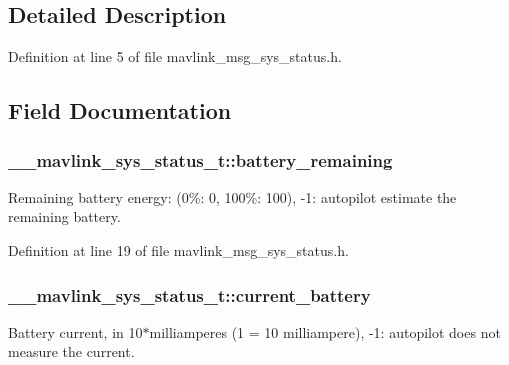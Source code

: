 \subsection{Detailed Description}


Definition at line 5 of file mavlink\-\_\-msg\-\_\-sys\-\_\-status.\-h.



\subsection{Field Documentation}
\hypertarget{struct____mavlink__sys__status__t_a89ff7e5cb3d8a698ace5c6653479b71e}{
\subsubsection[{battery\-\_\-remaining}]{ \-\_\-\-\_\-mavlink\-\_\-sys\-\_\-status\-\_\-t\-::battery\-\_\-remaining}}\label{struct____mavlink__sys__status__t_a89ff7e5cb3d8a698ace5c6653479b71e}


Remaining battery energy\-: (0\%\-: 0, 100\%\-: 100), -\/1\-: autopilot estimate the remaining battery. 



Definition at line 19 of file mavlink\-\_\-msg\-\_\-sys\-\_\-status.\-h.

\hypertarget{struct____mavlink__sys__status__t_a78ab5021909544c255827e8b2bd23034}{
\subsubsection[{current\-\_\-battery}]{ \-\_\-\-\_\-mavlink\-\_\-sys\-\_\-status\-\_\-t\-::current\-\_\-battery}}\label{struct____mavlink__sys__status__t_a78ab5021909544c255827e8b2bd23034}


Battery current, in 10$\ast$milliamperes (1 = 10 milliampere), -\/1\-: autopilot does not measure the current. 



